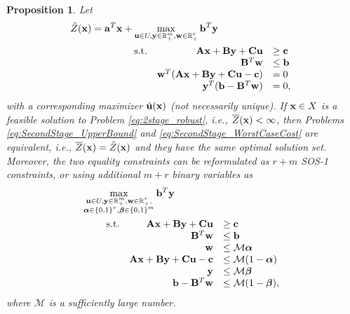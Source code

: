\documentclass[12pt,x11names]{article}
\newtheorem{proposition}{Proposition} %
\theoremstyle{definition}
\newcommand{\real}{\mathbb{R}} %
\newcommand{\ie}{{\em i.e.}, }
\newcommand{\ba}{{\bf a}}
\newcommand{\bb}{{\bf b}}
\newcommand{\bc}{{\bf c}}
\newcommand{\bu}{{\bf u}}
\newcommand{\bw}{{\bf w}}
\newcommand{\bx}{{\bf x}}
\newcommand{\by}{{\bf y}}
\newcommand{\bba}{{\bf A}}
\newcommand{\bbb}{{\bf B}}
\newcommand{\bbc}{{\bf C}}
\newcommand{\balpha}{{\boldsymbol \alpha}}
\newcommand{\bbeta}{{\boldsymbol \beta}}
\begin{document}
\begin{proposition}\label{prop:CCG_equiv}
Let
\begin{equation}\label{eq:SecondStage_WorstCaseCost}
\begin{aligned}[t]
&\tilde{Z}(\bx)=\ba^T\bx+\max_{\bu\in U,\by\in\real^m_+,\bw\in \real_+^r} \bb^T\by\\
&\begin{array}{crl}\qquad\qquad\qquad \textnormal{s.t.} & \bba\bx+\bbb\by+\bbc\bu&\geq \bc\\
& \bbb^T\bw&\leq \bb\\
& \bw^T(\bba\bx+\bbb\by+\bbc\bu-\bc)&=0\\
& \by^T(\bb-\bbb^T\bw)&=0,\end{array}
\end{aligned}
\end{equation}
with a corresponding maximizer $\tilde{\bu}(\bx)$ (not necessarily unique). If $\bx\in X$ is a feasible solution to Problem \eqref{eq:2stage_robust}, \ie $\overline{Z}(\bx)<\infty$, then  Problems  \eqref{eq:SecondStage_UpperBound} and \eqref{eq:SecondStage_WorstCaseCost} are equivalent, \ie
$\overline{Z}(\bx)=\tilde{Z}(\bx)$ and they have the same optimal solution set. 
Moreover, the two equality constraints can be reformulated as $r+m$ SOS-1 constraints, or using additional $m+r$ binary variables 
as
\begin{equation}\label{eq:SecondStage_WorstCaseMIO}
\begin{aligned}[t]
&\max_{\substack{\bu\in U,\by\in\real^m_+,\bw\in \real_+^r,\\
		\balpha\in\{0,1\}^r,\bbeta\in\{0,1\}^m}} \bb^T\by\\
&\begin{array}{crl}\qquad \textnormal{s.t.} & \bba\bx+\bbb\by+\bbc\bu&\geq \bc\\
& \bbb^T\bw&\leq \bb\\
& \bw&\leq \mathcal{M}\balpha\\
& \bba\bx+\bbb\by+\bbc\bu-\bc&\leq \mathcal{M}(1-\balpha)\\
& \by&\leq \mathcal{M}\bbeta\\
&\bb-\bbb^T\bw&\leq\mathcal{M}(1-\bbeta),\end{array}
\end{aligned}
\end{equation}
where $\mathcal{M}$ is a sufficiently large number.
\end{proposition}
\end{document}
